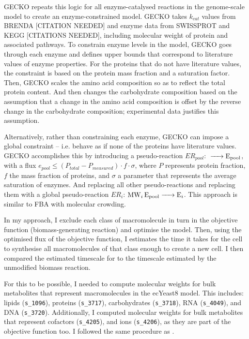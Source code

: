 GECKO repeats this logic for all enzyme-catalysed reactions in the genome-scale model to create an enzyme-constrained model.
GECKO takes $k_{cat}$ values from BRENDA [CITATION NEEDED] and enzyme data from SWISSPROT and KEGG [CITATIONS NEEDED], including molecular weight of protein and associated pathways.
To constrain enzyme levels in the model, GECKO goes through each enzyme and defines upper bounds that correspond to literature values of enzyme properties.
For the proteins that do not have literature values, the constraint is based on the protein mass fraction and a saturation factor.
Then, GECKO scales the amino acid composition so as to reflect the total protein content.
And then changes the carbohydrate composition based on the assumption that a change in the amino acid composition is offset by the reverse change in the carbohydrate composition;
experimental data justifies this assumption.

Alternatively, rather than constraining each enzyme, GECKO can impose a global constraint -- i.e. behave as if none of the proteins have literature values.
GECKO accomplishes this by introducing a pseudo-reaction $ER_{pool}$: $\ce{ -> E_{pool} }$, with a flux $e_{pool} \le (P_{total} - P_{measured}) \cdot f \cdot \sigma$, where $P$ represents protein fraction, $f$ the mass fraction of proteins, and $\sigma$ a parameter that represents the average saturation of enzymes.
And replacing all other pseudo-reactions and replacing them with a global pseudo-reaction $ER_{i}$: $\ce{ MW_{i} E_{pool} -> E_{i} }$.
This approach is similar to FBA with molecular crowding.

In my approach, I exclude each class of macromolecule in turn in the objective function (biomass-generating reaction) and optimise the model.
Then, using the optimised flux of the objective function, I estimates the time it takes for the cell to synthesise all macromolecules of that class enough to create a new cell.
I then compared the estimated timescale for to the timescale estimated by the unmodified biomass reaction.

For this to be possible, I needed to compute molecular weights for bulk metabolites that represent macromolecules in the ecYeast8 model.
This includes: lipids (\texttt{s_1096}), proteins (\texttt{s_3717}), carbohydrates (\texttt{s_3718}), RNA (\texttt{s_4049}), and DNA (\texttt{s_3720}).
Additionally, I computed molecular weights for bulk metabolites that represent cofactors (\texttt{s_4205}), and ions (\texttt{s_4206}), as they are part of the objective function too.
I followed the same procedure as \parencite{takhaveevTemporalSegregationBiosynthetic2023}.

